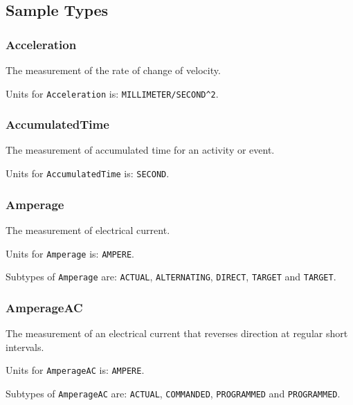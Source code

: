 \subsection{Sample Types} \label{sec:SampleTypes}

\subsubsection{Acceleration}
  \label{sec:Acceleration}



The measurement of the rate of change of velocity.


Units for \texttt{Acceleration} is: \texttt{MILLIMETER/SECOND\^{}2}.

\FloatBarrier

\subsubsection{AccumulatedTime}
  \label{sec:AccumulatedTime}



The measurement of accumulated time for an activity or event.


Units for \texttt{AccumulatedTime} is: \texttt{SECOND}.

\FloatBarrier

\subsubsection{Amperage}
  \label{sec:Amperage}



The measurement of electrical current.


Units for \texttt{Amperage} is: \texttt{AMPERE}.


Subtypes of \texttt{Amperage} are: \texttt{ACTUAL}, \texttt{ALTERNATING}, \texttt{DIRECT}, \texttt{TARGET} and \texttt{TARGET}. 
\FloatBarrier

\subsubsection{AmperageAC}
  \label{sec:AmperageAC}



The measurement of an electrical current that reverses direction at regular short intervals.


Units for \texttt{AmperageAC} is: \texttt{AMPERE}.


Subtypes of \texttt{AmperageAC} are: \texttt{ACTUAL}, \texttt{COMMANDED}, \texttt{PROGRAMMED} and \texttt{PROGRAMMED}. 
\FloatBarrier

